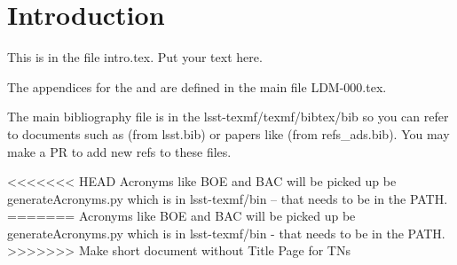 \section{Introduction} \label{sec:intro}
This is in the file intro.tex. Put your text here.

The appendices for the  and  are defined in the main file LDM-000.tex.

The main bibliography file is in the lsst-texmf/texmf/bibtex/bib so you can refer to documents such as  (from lsst.bib)  or papers like \cite{2008arXiv0805.2366I} (from refs\_ads.bib). You may make a PR to add new refs to these files.

<<<<<<< HEAD
Acronyms like BOE and BAC will be picked up be generateAcronyms.py which is in lsst-texmf/bin -- that needs to be in the PATH.
=======
Acronyms like BOE and BAC will be picked up be generateAcronyms.py which is in lsst-texmf/bin - that needs to be in the PATH.
>>>>>>> Make short document without Title Page for TNs
